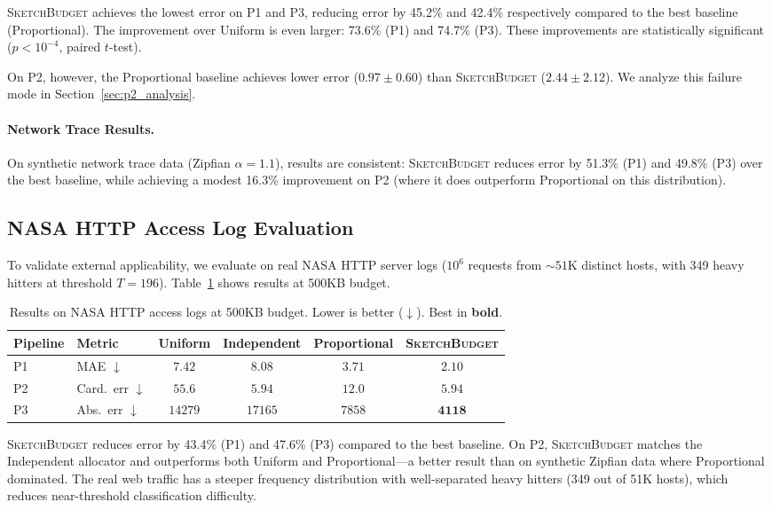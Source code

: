 \documentclass[preprint]{article}
\newcommand{\SketchBudget}{\textsc{SketchBudget}}
\begin{document}
\SketchBudget{} achieves the lowest error on P1 and P3, reducing error by 45.2\% and 42.4\% respectively compared to the best baseline (Proportional). The improvement over Uniform is even larger: 73.6\% (P1) and 74.7\% (P3). These improvements are statistically significant ($p < 10^{-4}$, paired $t$-test).

On P2, however, the Proportional baseline achieves lower error ($0.97 \pm 0.60$) than \SketchBudget{} ($2.44 \pm 2.12$). We analyze this failure mode in Section~\ref{sec:p2_analysis}.

\paragraph{Network Trace Results.}
On synthetic network trace data (Zipfian $\alpha=1.1$), results are consistent: \SketchBudget{} reduces error by 51.3\% (P1) and 49.8\% (P3) over the best baseline, while achieving a modest 16.3\% improvement on P2 (where it does outperform Proportional on this distribution).

\subsection{NASA HTTP Access Log Evaluation}

To validate external applicability, we evaluate on real NASA HTTP server logs ($10^6$ requests from ${\sim}51$K distinct hosts, with 349 heavy hitters at threshold $T=196$). Table~\ref{tab:nasa} shows results at 500KB budget.

\begin{table}[t]
\centering
\caption{Results on NASA HTTP access logs at 500KB budget. Lower is better ($\downarrow$). Best in \textbf{bold}.}
\label{tab:nasa}
\begin{tabular}{llcccc}
\toprule
Pipeline & Metric & Uniform & Independent & Proportional & \SketchBudget{} \\
\midrule
P1 & MAE $\downarrow$ & $7.42$ & $8.08$ & $3.71$ & $\mathbf{2.10}$ \\
P2 & Card.\ err $\downarrow$ & $55.6$ & $\mathbf{5.94}$ & $12.0$ & $\mathbf{5.94}$ \\
P3 & Abs.\ err $\downarrow$ & $14279$ & $17165$ & $7858$ & $\mathbf{4118}$ \\
\bottomrule
\end{tabular}
\end{table}

\SketchBudget{} reduces error by 43.4\% (P1) and 47.6\% (P3) compared to the best baseline. On P2, \SketchBudget{} matches the Independent allocator and outperforms both Uniform and Proportional---a better result than on synthetic Zipfian data where Proportional dominated. The real web traffic has a steeper frequency distribution with well-separated heavy hitters (349 out of 51K hosts), which reduces near-threshold classification difficulty.
\end{document}
